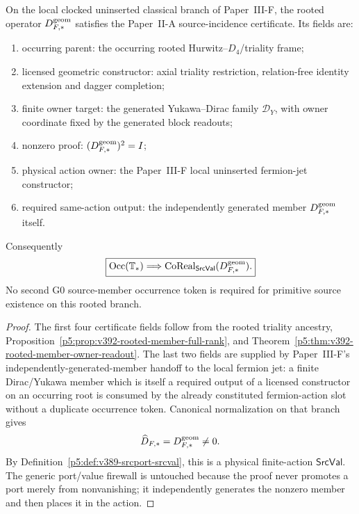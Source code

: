 \documentclass[12pt,a4paper]{article}
\begin{document}
\begin{theorem}
\label{p5:thm:v392-rooted-srcval-incidence}
On the local clocked uninserted classical branch of Paper~III-F, the rooted
operator $D_{F,*}^{\rm geom}$ satisfies the Paper~II-A source-incidence
certificate.  Its fields are:
\begin{enumerate}
\item occurring parent: the occurring rooted Hurwitz--$D_4$/triality frame;
\item licensed geometric constructor: axial triality restriction,
      relation-free identity extension and dagger completion;
\item finite owner target: the generated Yukawa--Dirac family $\mathscr D_Y$,
      with owner coordinate fixed by the generated block readouts;
\item nonzero proof: $(D_{F,*}^{\rm geom})^2=I$;
\item physical action owner: the Paper~III-F local uninserted fermion-jet
      constructor;
\item required same-action output: the independently generated member
      $D_{F,*}^{\rm geom}$ itself.
\end{enumerate}
Consequently
\[
 \boxed{\operatorname{Occ}(\mathbb T_*)
 \Longrightarrow
 \operatorname{CoReal}_{\mathsf{SrcVal}}(D_{F,*}^{\rm geom}).}
\]
No second G0 source-member occurrence token is required for primitive source
existence on this rooted branch.
\end{theorem}

\begin{proof}
The first four certificate fields follow from the rooted triality ancestry,
Proposition~\ref{p5:prop:v392-rooted-member-full-rank}, and
Theorem~\ref{p5:thm:v392-rooted-member-owner-readout}.  The last two fields
are supplied by Paper~III-F's independently-generated-member handoff to the
local fermion jet: a finite Dirac/Yukawa member which is itself a required
output of a licensed constructor on an occurring root is consumed by the
already constituted fermion-action slot without a duplicate occurrence token.
Canonical normalization on that branch gives
\[
 \widehat D_{F,*}=D_{F,*}^{\rm geom}\neq0.
\]
By Definition~\ref{p5:def:v389-srcport-srcval}, this is a physical finite-action
$\mathsf{SrcVal}$.  The generic port/value firewall is untouched because the
proof never promotes a port merely from nonvanishing; it independently
generates the nonzero member and then places it in the action.
\end{proof}
\end{document}
